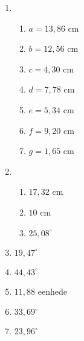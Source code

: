 {\begin{multicols}{3}
\begin{enumerate}[noitemsep, label=\textbf{\arabic*}. ]
\item %

    \begin{enumerate}[noitemsep, label=\textbf{(\alph*)} ]
\item$a=13,86$ cm
\item$b=12,56$ cm
\item$c=4,30$ cm
\item$d=7,78$ cm
\item$e=5,34$ cm
\item$f=9,20$ cm
\item$g=1,65$ cm
      \end{enumerate}
\item %
\begin{enumerate}[noitemsep, label=\textbf{(\alph*)} ]
\item $17,32$ cm%
\item $10$ cm%
\item $25,08^{\circ}$%
\end{enumerate} 
\item $19,47^{\circ}$%
\item $44,43^{\circ}$%

\item $11,88$ eenhede%
 
\item $33,69^{\circ}$%
\item $23,96^{\circ}$%



\end{enumerate}
\end{multicols}}
